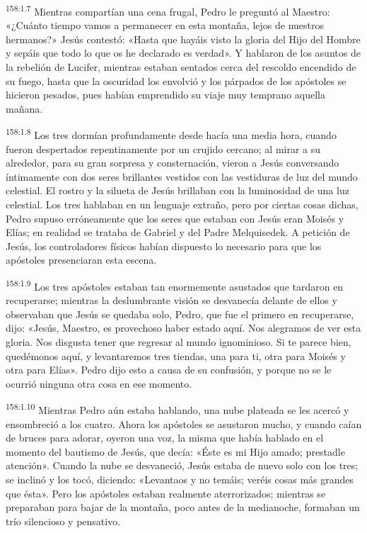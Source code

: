 \par 
\textsuperscript{158:1.7} Mientras compartían una cena frugal, Pedro le preguntó al Maestro: «¿Cuánto tiempo vamos a permanecer en esta montaña, lejos de nuestros hermanos?» Jesús contestó: «Hasta que hayáis visto la gloria del Hijo del Hombre y sepáis que todo lo que os he declarado es verdad». Y hablaron de los asuntos de la rebelión de Lucifer, mientras estaban sentados cerca del rescoldo encendido de su fuego, hasta que la oscuridad los envolvió y los párpados de los apóstoles se hicieron pesados, pues habían emprendido su viaje muy temprano aquella mañana.

\par 
\textsuperscript{158:1.8} Los tres dormían profundamente desde hacía una media hora, cuando fueron despertados repentinamente por un crujido cercano; al mirar a su alrededor, para su gran sorpresa y consternación, vieron a Jesús conversando íntimamente con dos seres brillantes vestidos con las vestiduras de luz del mundo celestial. El rostro y la silueta de Jesús brillaban con la luminosidad de una luz celestial. Los tres hablaban en un lenguaje extraño, pero por ciertas cosas dichas, Pedro supuso erróneamente que los seres que estaban con Jesús eran Moisés y Elías; en realidad se trataba de Gabriel y del Padre Melquisedek. A petición de Jesús, los controladores físicos habían dispuesto lo necesario para que los apóstoles presenciaran esta escena.

\par 
\textsuperscript{158:1.9} Los tres apóstoles estaban tan enormemente asustados que tardaron en recuperarse; mientras la deslumbrante visión se desvanecía delante de ellos y observaban que Jesús se quedaba solo, Pedro, que fue el primero en recuperarse, dijo: «Jesús, Maestro, es provechoso haber estado aquí. Nos alegramos de ver esta gloria. Nos disgusta tener que regresar al mundo ignominioso. Si te parece bien, quedémonos aquí, y levantaremos tres tiendas, una para ti, otra para Moisés y otra para Elías». Pedro dijo esto a causa de su confusión, y porque no se le ocurrió ninguna otra cosa en ese momento.

\par 
\textsuperscript{158:1.10} Mientras Pedro aún estaba hablando, una nube plateada se les acercó y ensombreció a los cuatro. Ahora los apóstoles se asustaron mucho, y cuando caían de bruces para adorar, oyeron una voz, la misma que había hablado en el momento del bautismo de Jesús, que decía: «Éste es mi Hijo amado; prestadle atención». Cuando la nube se desvaneció, Jesús estaba de nuevo solo con los tres; se inclinó y los tocó, diciendo: «Levantaos y no temáis; veréis cosas más grandes que ésta». Pero los apóstoles estaban realmente aterrorizados; mientras se preparaban para bajar de la montaña, poco antes de la medianoche, formaban un trío silencioso y pensativo.

